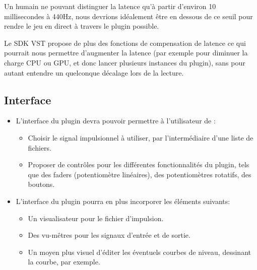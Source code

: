 Un humain ne pouvant distinguer la latence qu'à partir d'environ 10 millisecondes à 440Hz, nous devrions idéalement être en dessous de ce seuil pour rendre le jeu en direct à travers le plugin possible.

Le SDK VST propose de plus des fonctions de compensation de latence ce qui pourrait nous permettre d'augmenter la latence (par exemple pour diminuer la charge CPU ou GPU, et donc lancer plusieurs instances du plugin), sans pour autant entendre un quelconque décalage lors de la lecture.
\subsection{Interface}
\begin{itemize}
    \item L'interface du plugin devra pouvoir permettre à l'utilisateur de :
    \begin{itemize}
	\item Choisir le signal impulsionnel à utiliser, par l'intermédiaire d'une liste de fichiers.
	\item Proposer de contrôles pour les différentes fonctionnalités du plugin, tels que des faders (potentiomètre linéaires), des potentiomètres rotatifs, des boutons.
    \end{itemize}
    \item L'interface du plugin pourra en plus incorporer les éléments suivants:
    \begin{itemize}
	\item Un visualisateur pour le fichier d'impulsion.
	\item Des vu-mêtres pour les signaux d'entrée et de sortie.
	\item Un moyen plus visuel d'éditer les éventuels courbes de niveau, dessinant la courbe, par exemple.
    \end{itemize}
\end{itemize}


